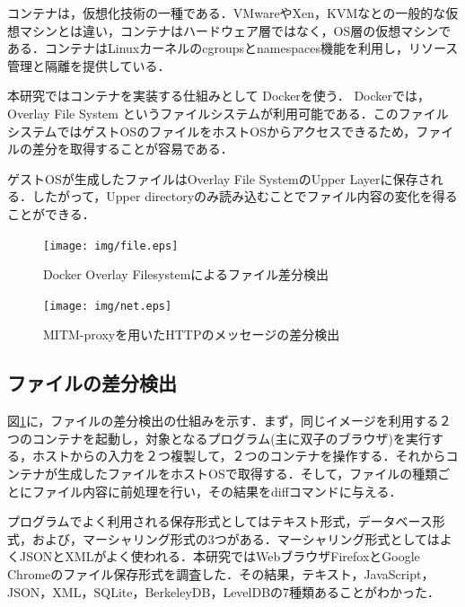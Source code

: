 \documentclass[submit,techrep]{ipsj}
\begin{document}
コンテナは，仮想化技術の一種である．VMwareやXen，KVMなとの一般的な仮想マシンとは違い，コンテナはハードウェア層ではなく，OS層の仮想マシンである．コンテナはLinuxカーネルのcgroupsとnamespaces機能を利用し，リソース管理と隔離を提供している．


本研究ではコンテナを実装する仕組みとして Dockerを使う． Dockerでは， Overlay File System というファイルシステムが利用可能である．このファイルシステムではゲストOSのファイルをホストOSからアクセスできるため，ファイルの差分を取得することが容易である．

ゲストOSが生成したファイルはOverlay File SystemのUpper Layerに保存される．したがって，Upper directoryのみ読み込むことでファイル内容の変化を得ることができる．




\begin{figure}[ht]
\begin{center}
\texttt{[image: img/file.eps]}
\caption{Docker Overlay Filesystemによるファイル差分検出}
\label{figure:file}
\end{center}
\end{figure}

\begin{figure}[ht]
\begin{center}
\texttt{[image: img/net.eps]}
\caption{MITM-proxyを用いたHTTPのメッセージの差分検出}
\label{figure:network}
\end{center}
\end{figure}


\subsection{ファイルの差分検出}
\label{cha:file}

図\ref{figure:file}に，ファイルの差分検出の仕組みを示す．まず，同じイメージを利用する２つのコンテナを起動し，対象となるプログラム(主に双子のブラウザ)を実行する，ホストからの入力を２つ複製して，２つのコンテナを操作する．それからコンテナが生成したファイルをホストOSで取得する．そして，ファイルの種類ごとにファイル内容に前処理を行い，その結果をdiffコマンドに与える．

\label{sec:prep}
プログラムでよく利用される保存形式としてはテキスト形式，データベース形式，および，マーシャリング形式の3つがある．マーシャリング形式としてはよくJSONとXMLがよく使われる．本研究ではWebブラウザFirefoxとGoogle Chromeのファイル保存形式を調査した．その結果，テキスト，JavaScript，JSON，XML，SQLite，BerkeleyDB，LevelDBの7種類あることがわかった．
\end{document}
